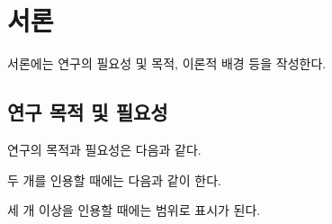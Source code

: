 \section{서론}
서론에는 연구의 필요성 및 목적, 이론적 배경 등을 작성한다.

\subsection{연구 목적 및 필요성}
연구의 목적과 필요성은 다음과 같다\cite{Taylor1989}.

두 개를 인용할 때에는 다음과 같이 한다\cite{aksin,gillies}.

세 개 이상을 인용할 때에는 범위로 표시가 된다\cite{Taylor1989,aksin,gillies,Intel1988}.